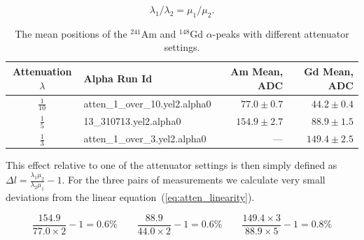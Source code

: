 \documentclass[a4paper,12pt]{article}
\newcommand\americium{${}^{241}$Am}
\newcommand\gadolinium{${}^{148}$Gd}
\begin{document}
\begin{equation}
\lambda_1/\lambda_2 = \mu_1/ \mu_2.
\label{eq:atten_linearity}
\end{equation}


\begin{table}[htb]
\caption{The mean positions of the \americium{} and \gadolinium{} $\alpha$-peaks
with different attenuator settings.}
\centering

\begin{tabular}{clrr}
\toprule
Attenuation $\lambda$ & Alpha Run Id      & Am Mean, ADC      & Gd Mean, ADC \\
\midrule
$\frac{1}{10}$  & \small{atten\_1\_over\_10.yel2.alpha0}  & $77.0\pm0.7$      & $44.2\pm0.4$ \\
\addlinespace
$\frac{1}{5}$   & \small{13\_310713.yel2.alpha0}          & $154.9\pm2.7$     & $88.9\pm1.5$ \\
\addlinespace
$\frac{1}{3}$   & \small{atten\_1\_over\_3.yel2.alpha0}   & ---\hspace{20pt}  & $149.4\pm2.5$ \\
\bottomrule
\end{tabular}

\label{table:atten}
\end{table}

\noindent
This effect relative to one of the attenuator settings is then simply defined as
$\Delta l = \frac{\lambda_1 \mu_2}{\lambda_2 \mu_1} - 1$. For the three pairs
of measurements we calculate very small deviations from the linear
equation~(\ref{eq:atten_linearity}).

\begin{equation}
\frac{154.9}{77.0 \times 2} - 1 = 0.6\%
\qquad
\frac{88.9}{44.0 \times 2} - 1 = 0.6\%
\qquad
\frac{149.4 \times 3}{88.9 \times 5} - 1 = 0.8\%
\end{equation}
\end{document}
